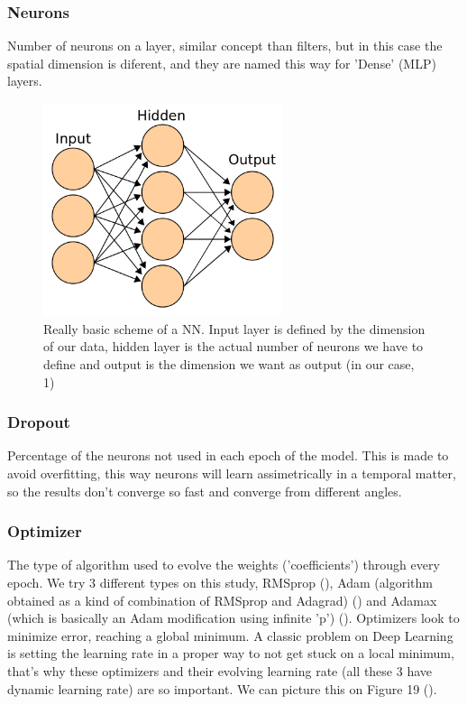 \documentclass[openany]{article}
\begin{document}
\subsubsection*{Neurons}

Number of neurons on a layer, similar concept than filters, but in this case the spatial dimension is diferent, and they are named this way for 'Dense' (MLP) layers.

\begin{figure}[!h]
    \centering
    \includegraphics[width=7cm]{neurons.png}
    \caption{Really basic scheme of a NN. Input layer is defined by the dimension of our data, hidden layer is the actual number of neurons we have to define and output is the dimension we want as output (in our case, 1) }
    \label{fig:my_label}
\end{figure}

\subsubsection*{Dropout}

Percentage of the neurons not used in each epoch of the model. This is made to avoid overfitting, this way neurons will learn assimetrically in a temporal matter, so the results don't converge so fast and converge from different angles.

\subsubsection*{Optimizer}

The type of algorithm used to evolve the weights ('coefficients') through every epoch. We try 3 different types on this study, RMSprop (\cite{RMSprop}), Adam (algorithm obtained as a kind of combination of RMSprop and Adagrad) (\cite{duchi2011adaptive}) and Adamax (which is basically an Adam modification using infinite 'p') (\cite{Adam}). Optimizers look to minimize error, reaching a global minimum. A classic problem on Deep Learning is setting the learning rate in a proper way to not get stuck on a local minimum, that's why these optimizers and their evolving learning rate (all these 3 have dynamic learning rate) are so important. We can picture this on Figure 19 (\cite{gradient}).
\end{document}

